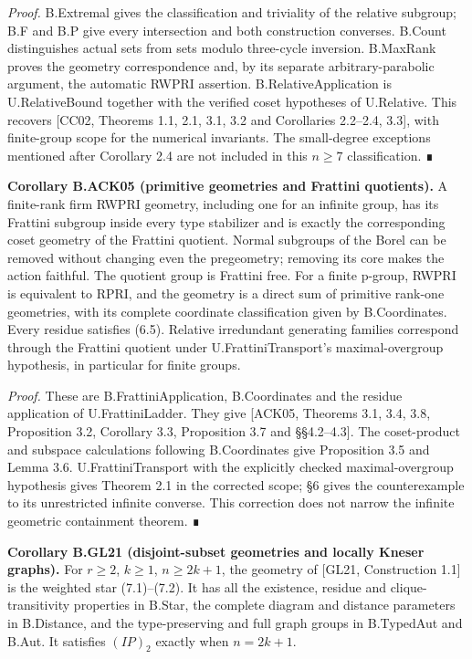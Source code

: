 \documentclass[
  11pt,
  a4paper,
]{article}
\begin{document}
\emph{Proof.} B.Extremal gives the classification and triviality of the
relative subgroup; B.F and B.P give every intersection and both
construction converses. B.Count distinguishes actual sets from sets
modulo three-cycle inversion. B.MaxRank proves the geometry
correspondence and, by its separate arbitrary-parabolic argument, the
automatic RWPRI assertion. B.RelativeApplication is U.RelativeBound
together with the verified coset hypotheses of U.Relative. This recovers
{[}CC02, Theorems 1.1, 2.1, 3.1, 3.2 and Corollaries 2.2--2.4, 3.3{]},
with finite-group scope for the numerical invariants. The small-degree
exceptions mentioned after Corollary 2.4 are not included in this
\(n\geq7\) classification. ∎

\textbf{Corollary B.ACK05 (primitive geometries and Frattini
quotients).} A finite-rank firm RWPRI geometry, including one for an
infinite group, has its Frattini subgroup inside every type stabilizer
and is exactly the corresponding coset geometry of the Frattini
quotient. Normal subgroups of the Borel can be removed without changing
even the pregeometry; removing its core makes the action faithful. The
quotient group is Frattini free. For a finite p-group, RWPRI is
equivalent to RPRI, and the geometry is a direct sum of primitive
rank-one geometries, with its complete coordinate classification given
by B.Coordinates. Every residue satisfies (6.5). Relative irredundant
generating families correspond through the Frattini quotient under
U.FrattiniTransport's maximal-overgroup hypothesis, in particular for
finite groups.

\emph{Proof.} These are B.FrattiniApplication, B.Coordinates and the
residue application of U.FrattiniLadder. They give {[}ACK05, Theorems
3.1, 3.4, 3.8, Proposition 3.2, Corollary 3.3, Proposition 3.7 and
§§4.2--4.3{]}. The coset-product and subspace calculations following
B.Coordinates give Proposition 3.5 and Lemma 3.6. U.FrattiniTransport
with the explicitly checked maximal-overgroup hypothesis gives Theorem
2.1 in the corrected scope; §6 gives the counterexample to its
unrestricted infinite converse. This correction does not narrow the
infinite geometric containment theorem. ∎

\textbf{Corollary B.GL21 (disjoint-subset geometries and locally Kneser
graphs).} For \(r\geq2\), \(k\geq1\), \(n\geq2k+1\), the geometry of
{[}GL21, Construction 1.1{]} is the weighted star (7.1)--(7.2). It has
all the existence, residue and clique-transitivity properties in B.Star,
the complete diagram and distance parameters in B.Distance, and the
type-preserving and full graph groups in B.TypedAut and B.Aut. It
satisfies \((IP)_2\) exactly when \(n=2k+1\).
\end{document}
